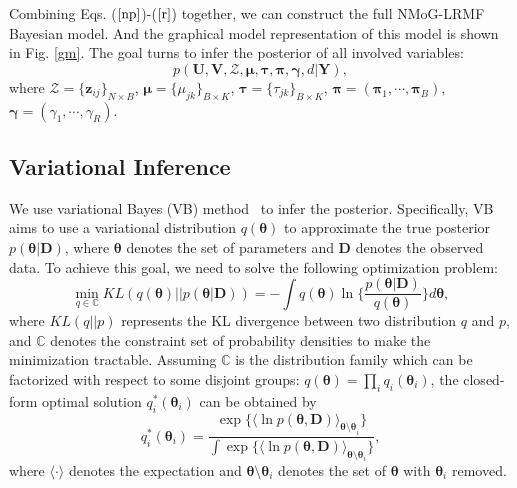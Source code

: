 \documentclass[journal]{IEEEtran}
\begin{document}
Combining Eqs. ($ \ref{np} $)-($ \ref{r} $) together, we can construct the full NMoG-LRMF Bayesian model. And the graphical model representation of this model is shown in Fig. \ref{gm}. The goal turns to infer the posterior of all involved variables:
\begin{equation}\label{post}
p(\bm{U,V,\mathcal{Z},\mu,\tau,\pi,\gamma},d|\bm{Y}),
\end{equation}
where $ \mathcal{Z}=\{\bm{z}_{ij}\}_{N\times B} $, $ \bm{\mu} = \{\mu_{jk}\}_{B\times K} $, $ \bm{\tau} =\{\tau_{jk}\}_{B\times K} $, $ \bm{\pi} = (\bm{\pi}_1,\cdots, \bm{\pi}_B) $, $\bm{\gamma} = (\gamma_1,\cdots,\gamma_R) $.


\subsection{Variational Inference}

We use variational Bayes (VB) method~\cite{bishop2006pattern} to infer the posterior. Specifically, VB aims to use a variational distribution  $ q(\bm{\theta})$ to approximate the true posterior $ p(\bm{\theta|D}) $, where $ \bm{\theta} $ denotes the set of parameters and $ \bm{D} $ denotes the observed data. To achieve this goal, we need to solve the following optimization problem:
\begin{equation}\label{Lq}
\min_{q\in \mathbb{C}} KL(q(\bm{\theta})||p(\bm{\theta|D})) = -\int q(\bm{\theta}) \ln\{\frac{p(\bm{\theta|D})}{q(\bm{\theta})} \} d\bm{\theta},
\end{equation}
where $ KL(q||p) $ represents the KL divergence between two distribution $ q$ and $ p $, and $ \mathbb{C} $ denotes the constraint set of probability densities to make the minimization tractable. Assuming $ \mathbb{C} $ is the distribution family which can be factorized with respect to some disjoint groups: $ q(\bm{\theta})=\prod_i q_i(\bm{\theta}_i) $, the closed-form optimal solution $ q_i^*(\bm{\theta}_i) $ can be obtained by
\begin{equation}\label{vi}
q_i^*(\bm{\theta}_i) = \frac{\exp\{ \langle \ln p(\bm{\theta,D}) \rangle _ {\bm{\theta \setminus \theta}_i} \}} {\int {\exp \{ \langle \ln p(\bm{\theta,D}) \rangle _ {\bm{\theta} \setminus \bm{\theta}_i} \}}},
\end{equation}
where $ \langle \cdot \rangle $ denotes the expectation and $ \bm{\theta} \setminus \bm{\theta}_i $ denotes the set of $ \bm{\theta}  $ with $ \bm{\theta}_i $ removed.
\end{document}
